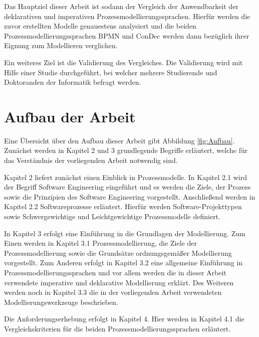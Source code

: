 Das Hauptziel dieser Arbeit ist sodann der Vergleich der Anwendbarkeit der deklarativen und imperativen Prozessmodellierungssprachen. Hierfür werden die zuvor erstellten Modelle genauestens analysiert und die beiden Prozessmodellierungssprachen BPMN und ConDec werden dann bezüglich ihrer Eignung zum Modellieren verglichen.\newline

Ein weiteres Ziel ist die Validierung des Vergleiches. Die Validierung wird mit Hilfe einer Studie durchgeführt, bei welcher mehrere Studierende und Doktoranden der Informatik befragt werden.\newline





\section{Aufbau der Arbeit}

Eine Übersicht über den Aufbau dieser Arbeit gibt Abbildung \ref{fig:Aufbau}.
Zunächst werden in Kapitel 2 und 3 grundlegende Begriffe erläutert, welche für das Verständnis der vorliegenden Arbeit notwendig sind.\newline

Kapitel 2 liefert zunächst einen Einblick in Prozessmodelle. In Kapitel 2.1 wird der Begriff Software Engineering eingeführt und es werden die Ziele, der Prozess sowie die Prinzipien des Software Engineering vorgestellt. Anschließend werden in Kapitel 2.2 Softwareprozesse erläutert. Hierfür werden Software-Projekttypen sowie Schwergewichtige und Leichtgewichtige Prozessmodelle definiert.\newline

In Kapitel 3 erfolgt eine Einführung in die Grundlagen der Modellierung. Zum Einen werden in Kapitel 3.1 Prozessmodellierung, die Ziele der Prozessmodellierung sowie die Grundsätze ordnungsgemäßer Modellierung vorgestellt. Zum Anderen erfolgt in Kapitel 3.2 eine allgemeine Einführung in Prozessmodellierungssprachen und vor allem werden die in dieser Arbeit verwendete imperative und deklarative Modellierung erklärt. Des Weiteren werden noch in Kapitel 3.3 die in der vorliegenden Arbeit verwendeten Modellierungswerkzeuge beschrieben.\newline

Die Anforderungserhebung erfolgt in Kapitel 4. Hier werden in Kapitel 4.1 die Vergleichskriterien für die beiden Prozessmodellierungssprachen erläutert.\newline

